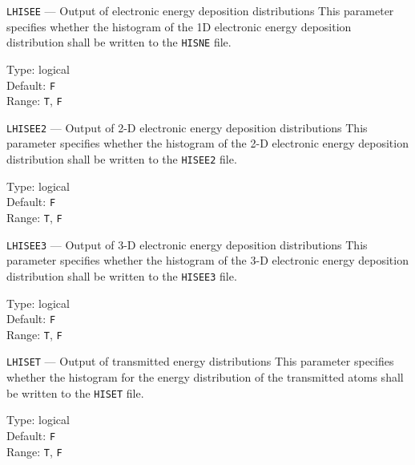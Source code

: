 \begin{keydescription}{\texttt{LHISEE} --- Output of electronic energy deposition 
    distributions}
%
  This parameter specifies whether the histogram of the 1D electronic energy
  deposition distribution shall be written to the \texttt{HISNE} file.
  \begin{keytab}
    Type:    \> logical \\
    Default: \> \texttt{F} \\
    Range:   \> \texttt{T}, \texttt{F} 
  \end{keytab}
\end{keydescription}

\begin{keydescription}{\texttt{LHISEE2} --- Output of 2-D electronic energy deposition distributions}
%
  This parameter specifies whether the histogram of the 2-D electronic energy
  deposition distribution shall be written to the \texttt{HISEE2} file.
  \begin{keytab}
    Type:    \> logical \\
    Default: \> \texttt{F} \\
    Range:   \> \texttt{T}, \texttt{F} 
  \end{keytab}
\end{keydescription}

\begin{keydescription}{\texttt{LHISEE3} --- Output of 3-D electronic energy deposition distributions}
%
  This parameter specifies whether the histogram of the 3-D electronic energy
  deposition distribution shall be written to the \texttt{HISEE3} file.
  \begin{keytab}
    Type:    \> logical \\
    Default: \> \texttt{F} \\
    Range:   \> \texttt{T}, \texttt{F} 
  \end{keytab}
\end{keydescription}

\begin{keydescription}{\texttt{LHISET} --- Output of transmitted energy distributions}
%
  This parameter specifies whether the histogram for the energy distribution of the 
  transmitted atoms shall be written to the \texttt{HISET} file.
  \begin{keytab}
    Type:    \> logical \\
    Default: \> \texttt{F} \\
    Range:   \> \texttt{T}, \texttt{F} 
  \end{keytab}
\end{keydescription}


